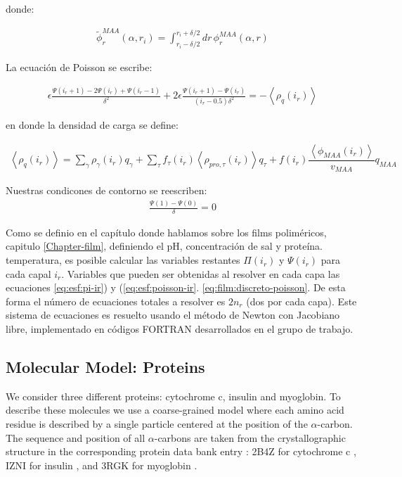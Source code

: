 \noindent donde:

\begin{align}
	\tilde{ \phi}^{MAA}_r(\alpha,r_i) = \int_{r_i -\delta/2}^{r_i + \delta/2} dr \, \phi^{MAA}_r(\alpha,r)
\end{align}

La ecuaci\'on de Poisson se escribe:

\begin{align}
	\epsilon \frac{\Psi(i_r +1) -2 \Psi(i_r) + \Psi(i_r -1)}{\delta ^2} + 2\epsilon \frac{\Psi(i_r +1) -\Psi(i_r)}{(i_r -0.5)\delta ^2}= -\left<\rho_q(i_r)\right>
	\label{eq:esf:poisson-ir}
\end{align}

\noindent en donde la densidad de carga se define:

\begin{align}
	\left<\rho_q(i_r)\right> = \sum_{\gamma } {\rho_\gamma(i_r) q_\gamma + \sum_\tau{f_\tau(i_r) \left<\rho_{pro,\tau}(i_r)\right> q_\tau} +  f(i_r)\dfrac{\left<\phi_{MAA}(i_r)\right>}{v_{MAA}}q_{MAA}}
\end{align}

Nuestras condicones de contorno se reescriben:
\begin{align}
	\frac{\Psi(1) - \Psi(0)}{\delta} = 0
\end{align}

Como se definio en el cap\'itulo donde hablamos sobre los films polim\'ericos, capitulo \ref{Chapter-film}, definiendo  el pH, concentraci\'on de sal y prote\'ina. temperatura, es posible calcular las variables restantes  $\Pi(i_r)$ y $\Psi(i_r)$ para cada capal $i_r$.
Variables que pueden ser obtenidas al resolver en cada capa las ecuaciones \ref{eq:esf:pi-ir}) y (\ref{eq:esf:poisson-ir}. \ref{eq:film:discreto-poisson}.
De esta forma el n\'umero de ecuaciones totales a resolver es $2n_r$ (dos por cada capa). 
Este sistema de ecuaciones es resuelto usando el m\'etodo de Newton con Jacobiano libre, implementado en c\'odigos FORTRAN desarrollados en el grupo de trabajo.



\subsection{Molecular Model: Proteins}\label{sect:protein}


We consider three different proteins:  cytochrome c, insulin and myoglobin.
To describe these molecules we use a coarse-grained model where each amino acid residue is described by a single particle centered at the position of the $\alpha$-carbon.
The sequence and position of all $\alpha$-carbons are taken from the crystallographic structure in the corresponding protein data bank entry : 2B4Z for cytochrome c , IZNI for insulin , and 3RGK for myoglobin \addcite[hubbard1990x]. 
 
